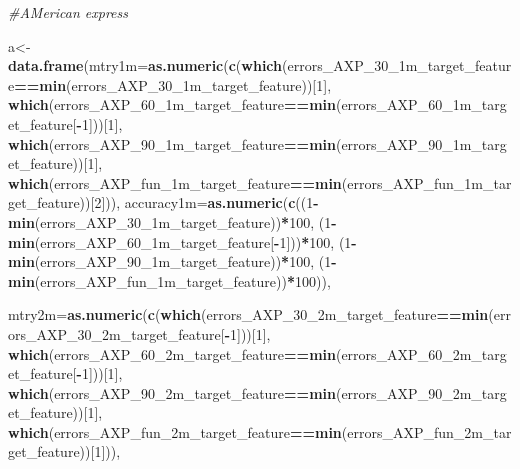 \documentclass[]{article}
\newenvironment{Shaded}{\begin{snugshade}}{\end{snugshade}}
\newcommand{\KeywordTok}[1]{\textcolor[rgb]{0.13,0.29,0.53}{\textbf{#1}}}
\newcommand{\DataTypeTok}[1]{\textcolor[rgb]{0.13,0.29,0.53}{#1}}
\newcommand{\DecValTok}[1]{\textcolor[rgb]{0.00,0.00,0.81}{#1}}
\newcommand{\CommentTok}[1]{\textcolor[rgb]{0.56,0.35,0.01}{\textit{#1}}}
\newcommand{\OperatorTok}[1]{\textcolor[rgb]{0.81,0.36,0.00}{\textbf{#1}}}
\newcommand{\NormalTok}[1]{#1}
\begin{document}
\begin{Shaded}
\begin{Highlighting}[]
\CommentTok{#AMerican express}


\NormalTok{a<-}\KeywordTok{data.frame}\NormalTok{(}\DataTypeTok{mtry1m=}\KeywordTok{as.numeric}\NormalTok{(}\KeywordTok{c}\NormalTok{(}\KeywordTok{which}\NormalTok{(errors_AXP_30_1m_target_feature}\OperatorTok{==}\KeywordTok{min}\NormalTok{(errors_AXP_30_1m_target_feature))[}\DecValTok{1}\NormalTok{],}
                                    \KeywordTok{which}\NormalTok{(errors_AXP_60_1m_target_feature}\OperatorTok{==}\KeywordTok{min}\NormalTok{(errors_AXP_60_1m_target_feature[}\OperatorTok{-}\DecValTok{1}\NormalTok{]))[}\DecValTok{1}\NormalTok{],}
                                   \KeywordTok{which}\NormalTok{(errors_AXP_90_1m_target_feature}\OperatorTok{==}\KeywordTok{min}\NormalTok{(errors_AXP_90_1m_target_feature))[}\DecValTok{1}\NormalTok{],}
                                   \KeywordTok{which}\NormalTok{(errors_AXP_fun_1m_target_feature}\OperatorTok{==}\KeywordTok{min}\NormalTok{(errors_AXP_fun_1m_target_feature))[}\DecValTok{2}\NormalTok{])),}
              \DataTypeTok{accuracy1m=}\KeywordTok{as.numeric}\NormalTok{(}\KeywordTok{c}\NormalTok{((}\DecValTok{1}\OperatorTok{-}\KeywordTok{min}\NormalTok{(errors_AXP_30_1m_target_feature))}\OperatorTok{*}\DecValTok{100}\NormalTok{,}
\NormalTok{                                    (}\DecValTok{1}\OperatorTok{-}\KeywordTok{min}\NormalTok{(errors_AXP_60_1m_target_feature[}\OperatorTok{-}\DecValTok{1}\NormalTok{]))}\OperatorTok{*}\DecValTok{100}\NormalTok{,}
\NormalTok{                                    (}\DecValTok{1}\OperatorTok{-}\KeywordTok{min}\NormalTok{(errors_AXP_90_1m_target_feature))}\OperatorTok{*}\DecValTok{100}\NormalTok{,}
\NormalTok{                                    (}\DecValTok{1}\OperatorTok{-}\KeywordTok{min}\NormalTok{(errors_AXP_fun_1m_target_feature))}\OperatorTok{*}\DecValTok{100}\NormalTok{)),}
              
              
              \DataTypeTok{mtry2m=}\KeywordTok{as.numeric}\NormalTok{(}\KeywordTok{c}\NormalTok{(}\KeywordTok{which}\NormalTok{(errors_AXP_30_2m_target_feature}\OperatorTok{==}\KeywordTok{min}\NormalTok{(errors_AXP_30_2m_target_feature[}\OperatorTok{-}\DecValTok{1}\NormalTok{]))[}\DecValTok{1}\NormalTok{],}
                                    \KeywordTok{which}\NormalTok{(errors_AXP_60_2m_target_feature}\OperatorTok{==}\KeywordTok{min}\NormalTok{(errors_AXP_60_2m_target_feature[}\OperatorTok{-}\DecValTok{1}\NormalTok{]))[}\DecValTok{1}\NormalTok{],}
                                   \KeywordTok{which}\NormalTok{(errors_AXP_90_2m_target_feature}\OperatorTok{==}\KeywordTok{min}\NormalTok{(errors_AXP_90_2m_target_feature))[}\DecValTok{1}\NormalTok{],}
                                   \KeywordTok{which}\NormalTok{(errors_AXP_fun_2m_target_feature}\OperatorTok{==}\KeywordTok{min}\NormalTok{(errors_AXP_fun_2m_target_feature))[}\DecValTok{1}\NormalTok{])),}
              

\end{Highlighting}
\end{Shaded}
\end{document}
